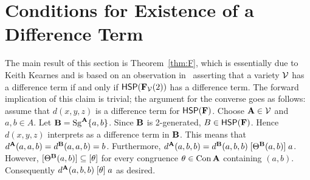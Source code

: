 

\section{Conditions for Existence of a Difference Term}
\label{sec:equiv-cond-exist}
The main result of this section is Theorem~\ref{thm:F}, which
is essentially due to Keith Kearnes and is based on an observation
in~\cite{MR1358491}
asserting that a variety $\mathcal{V}$ has a difference term if and only if
$\mathsf{H} \mathsf{S} \mathsf{P}(\mathbf{F}_{\mathcal{V}}(2))$
has a difference term.
The forward implication of this claim is trivial;
the argument for the converse goes as follows:
assume that $d(x, y, z)$ is a difference term for $\mathsf{H} \mathsf{S} \mathsf{P}(\mathbf{F})$.
Choose $\mathbf{A} \in \mathcal{V}$ and $a, b \in A$. Let $\mathbf{B} = \operatorname{Sg}^{\mathbf{A}} \{a, b\}$.
Since $\mathbf{B}$ is 2-generated, $B \in \mathsf{H} \mathsf{S} \mathsf{P} (\mathbf{F})$.
Hence $d(x, y, z)$ interprets as a difference term in $\mathbf{B}$. This means that
$d^{\mathbf{A}} (a, a, b) = d^{\mathbf{B}} (a, a, b) = b$.
Furthermore,
$d^{\mathbf{A}} (a, b, b) = d^{\mathbf{B}} (a, b, b)
\mathrel{[\Theta^{\mathbf{B}} (a, b)]} a$.
However,
$[\Theta^{\mathbf{B}} (a, b)] \subseteq [\theta]$
for every congruence
$\theta \in \operatorname{Con} \mathbf{A}$ containing $(a, b)$. Consequently
$d^{\mathbf{A}} (a, b, b)
\mathrel{[\theta]}
a$ as desired.

